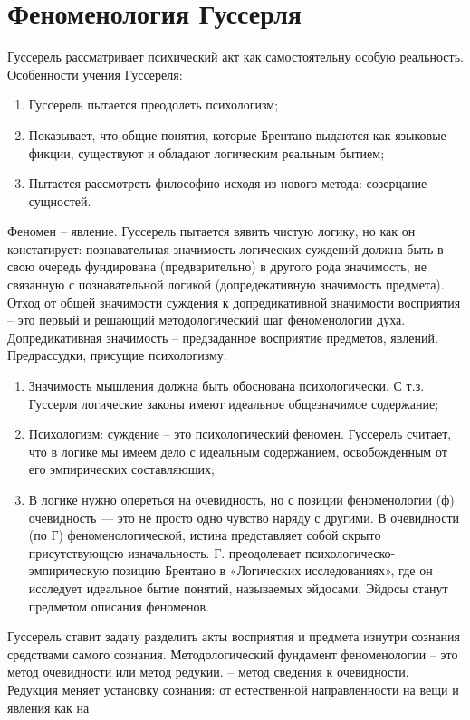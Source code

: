 \documentclass[12pt]{article}
\begin{document}
\newpage
\section{Феноменология Гуссерля}
Гуссерель  рассматривает  психический  акт  как  самостоятельну  особую  реальность.  Особенности  учения
Гуссереля:
\begin{enumerate}
  \item Гуссерель пытается преодолеть психологизм;
  \item Показывает, что общие понятия, которые Брентано выдаются как языковые фикции, существуют и обладают
логическим реальным бытием;
\item Пытается рассмотреть философию исходя из нового метода: созерцание сущностей.
\end{enumerate}
Феномен – явление.
Гуссерель пытается вявить чистую логику, но как он констатирует: познавательная значимость логических
суждений должна быть в свою очередь фундирована (предварительно) в другого рода значимость, не связанную
с познавательной логикой (допредекативную значимость предмета). Отход от общей значимости суждения к
допредикативной значимости восприятия – это первый и решающий методологический шаг феноменологии
духа. Допредикативная значимость – предзаданное восприятие предметов, явлений.
Предрассудки, присущие психологизму:
\begin{enumerate}
  \item Значимость мышления должна быть обоснована психологически. С т.з. Гуссерля логические законы имеют
идеальное общезначимое содержание;
\item Психологизм: суждение – это психологический феномен. Гуссерель считает, что в логике мы имеем дело с
идеальным содержанием, освобожденным от его эмпирических составляющих;
\item В логике нужно опереться на очевидность, но с позиции феноменологии (ф) очевидность — это не просто
одно чувство наряду с другими. В очевидности (по Г) феноменологической, истина представляет собой скрыто
присутствующсю  изначальность.  Г.  преодолевает  психологическо-эмпирическую  позицию  Брентано  в
«Логических  исследованиях»,  где  он  исследует  идеальное  бытие  понятий,  называемых  эйдосами.  Эйдосы
станут предметом описания феноменов.
\end{enumerate}
Гуссерель ставит задачу разделить акты восприятия и предмета изнутри сознания средствами самого сознания.
Методологический фундамент феноменологии – это метод очевидности или метод редукии. – метод сведения к
очевидности.
Редукция  меняет  установку  сознания:  от  естественной  направленности  на  вещи  и  явления  как  на
\end{document}
